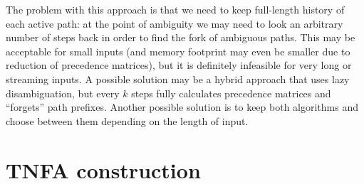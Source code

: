 \documentclass[AMA,STIX1COL]{WileyNJD-v2}
\begin{document}
The problem with this approach is that we need to keep full-length history of each active path:
at the point of ambiguity we may need to look an arbitrary number of steps back
in order to find the fork of ambiguous paths.
%
This may be acceptable for small inputs (and memory footprint may even be smaller due to reduction of precedence matrices),
but it is definitely infeasible for very long or streaming inputs.
%
A possible solution may be a hybrid approach that uses lazy disambiguation,
but every $k$ steps fully calculates precedence matrices and ``forgets'' path prefixes.
Another possible solution is to keep both algorithms and choose between them depending on the length of input.


\section{TNFA construction}\label{section_tnfa}
\end{document}
